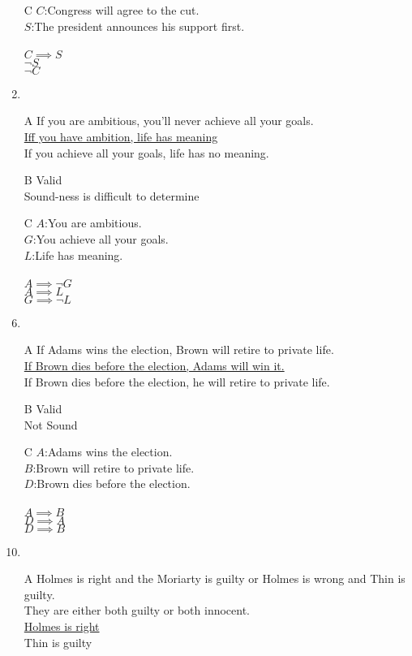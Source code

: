 \documentclass{article}
\begin{document}
\begin{enumerate}
\item[C]
$C$:Congress will agree to the cut.\\
$S$:The president announces his support first.\\
\\
$C \implies S$\\
\underline{$\lnot S$}\\
$\lnot C$
\item
\item[A]
If you are ambitious, you'll never achieve all your goals.
\\\underline{Iff you have ambition, life has meaning}
\\If you achieve all your goals, life has no meaning.
\item[B]
Valid
\\Sound-ness is difficult to determine
\item[C]
$A$:You are ambitious.\\
$G$:You achieve all your goals.\\
$L$:Life has meaning.\\
\\
$A \implies \lnot G$\\
\underline{$A \implies L$}\\
$G \implies \lnot L$
\item
\item[A]
If Adams wins the election, Brown will retire to private life.
\\\underline{If Brown dies before the election, Adams will win it.}
\\If Brown dies before the election, he will retire to private life.
\item[B]
Valid
\\Not Sound
\item[C]
$A$:Adams wins the election.\\
$B$:Brown will retire to private life.\\
$D$:Brown dies before the election.\\
\\
$A \implies B$\\
\underline{$D \implies A$}\\
$D \implies B$
\item
\item[A]
Holmes is right and the Moriarty is guilty or Holmes is wrong and Thin is guilty.
\\They are either both guilty or both innocent.
\\\underline{Holmes is right}
\\Thin is guilty

\end{enumerate}
\end{document}
